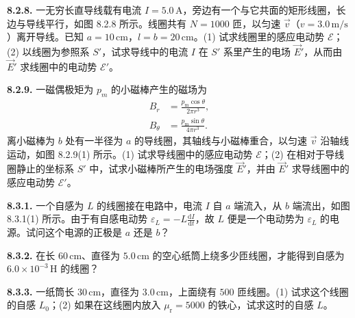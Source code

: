 \vfill
\newpage

\textbf{8.2.8.} 一无穷长直导线载有电流 $I = 5.0\,\mathrm{A}$，旁边有一个与它共面的矩形线圈，长边与导线平行，如图 8.2.8 所示。线圈共有 $N = 1000$ 匝，以匀速 $\vec{v}$（$v = 3.0\,\mathrm{m/s}$）离开导线。已知 $a = 10\,\mathrm{cm}$，$l = b = 20\,\mathrm{cm}$。(1) 试求线圈里的感应电动势 $\mathcal{E}$；(2) 以线圈为参照系 $S'$，试求导线中的电流 $I$ 在 $S'$ 系里产生的电场 $\vec{E}'$，从而由 $\vec{E}'$ 求线圈中的电动势 $\mathcal{E}'$。

\begin{center}
\end{center}

\vfill
\newpage

\textbf{8.2.9.} 一磁偶极矩为 $p_{m}$ 的小磁棒产生的磁场为
\[
\begin{aligned}
B_{r} &= \frac{p_{\mathrm{m}} \cos \theta}{2 \pi r^{3}}, \\
B_{\theta} &= \frac{p_{\mathrm{m}} \sin \theta}{4 \pi r^{3}}.
\end{aligned}
\]
离小磁棒为 $b$ 处有一半径为 $a$ 的导线圈，其轴线与小磁棒重合，以匀速 $\vec{v}$ 沿轴线运动，如图 8.2.9(1) 所示。(1) 试求导线圈中的感应电动势 $\mathcal{E}$；(2) 在相对于导线圈静止的坐标系 $S'$ 中，试求小磁棒所产生的电场强度 $\vec{E}'$，并由 $\vec{E}'$ 求导线圈中的感应电动势 $\mathcal{E}'$。

\begin{center}
\end{center}

\vfill
\newpage

\textbf{8.3.1.} 一个自感为 $L$ 的线圈接在电路中，电流 $I$ 自 $a$ 端流入，从 $b$ 端流出，如图 8.3.1(1) 所示。由于有自感电动势 $\displaystyle \varepsilon_{L} = -L \frac{\mathrm{d} I}{\mathrm{d} t}$，故 $L$ 便是一个电动势为 $\varepsilon_{L}$ 的电源。试问这个电源的正极是 $a$ 还是 $b$？

\begin{center}
\end{center}

\vfill
\newpage

\textbf{8.3.2.} 在长 $60\,\mathrm{cm}$、直径为 $5.0\,\mathrm{cm}$ 的空心纸筒上绕多少匝线圈，才能得到自感为 $6.0 \times 10^{-3}\,\mathrm{H}$ 的线圈？

\vfill
\newpage

\textbf{8.3.3.} 一纸筒长 $30\,\mathrm{cm}$，直径为 $3.0\,\mathrm{cm}$，上面绕有 $500$ 匝线圈。(1) 试求这个线圈的自感 $L_{0}$；(2) 如果在这线圈内放入 $\mu_{\mathrm{r}} = 5000$ 的铁心，试求这时的自感 $L$。

